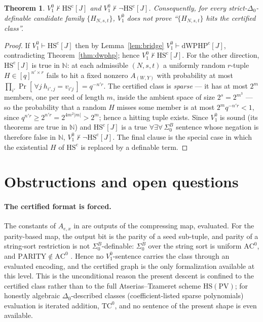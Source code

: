 \documentclass[11pt]{article}
\newtheorem{theorem}{Theorem}
\theoremstyle{definition}
\theoremstyle{remark}
\newcommand{\Vone}{V^0_1}
\newcommand{\HScert}{\mathrm{HS}^{\mathrm{c}}}
\newcommand{\dWPHPcert}{\mathrm{dWPHP}^{\mathrm{c}}}
\newcommand{\SigmaB}{\Sigma^B_0}
\begin{document}
\begin{theorem}\label{thm:hs}
$\Vone\nvdash\HScert[J]$ and $\Vone\nvdash\neg\HScert[J]$. Consequently, for
every strict-$\Delta_0$-definable candidate family $\{H_{N,s,t}\}$, $\Vone$ does
not prove ``$\{H_{N,s,t}\}$ hits the certified class''.
\end{theorem}

\begin{proof}
If $\Vone\vdash\HScert[J]$ then by Lemma~\ref{lem:bridge}
$\Vone\vdash\dWPHPcert[J]$, contradicting Theorem~\ref{thm:dwphp}; hence
$\Vone\nvdash\HScert[J]$. For the other direction, $\HScert[J]$ is true in
$\mathbb N$: at each admissible $(N,s,t)$ a uniformly random $r$-tuple $H\in
[q]^{n'\times r}$ fails to hit a fixed nonzero $A_{(W,Y)}$ with probability at
most $\prod_{i'}\Pr[\,\forall j\ h_{i',j}=v_{i'j}\,]=q^{-n'r}$. The certified
class is \emph{sparse} --- it has at most $2^{m}$ members, one per seed of length
$m$, inside the ambient space of size $2^{s}=2^{m^3}$
\cite[footnote~3]{AtseriasTzameret2025} --- so the probability that a random $H$
misses some member is at most $2^{m}q^{-n'r}<1$, since
$q^{n'r}\ge 2^{n'r}=2^{4m^2|m|}>2^{m}$; hence a hitting tuple exists. Since $\Vone$ is sound
(its theorems are true in $\mathbb N$) and $\HScert[J]$ is a true
$\forall\exists\forall\,\SigmaB$ sentence whose negation is therefore false in
$\mathbb N$, $\Vone\nvdash\neg\HScert[J]$. The final clause is the special case
in which the existential $H$ of $\HScert$ is replaced by a definable term.
\end{proof}

\section{Obstructions and open questions}\label{sec:obstructions}

\paragraph{The certified format is forced.} The constants of $A_{e,x}$ in
\cite{AtseriasTzameret2025} are outputs of the compressing map, evaluated. For
the parity-based map, the output bit is the parity of a seed sub-tuple, and
parity of a string-sort restriction is not $\SigmaB$-definable: $\SigmaB$ over
the string sort is uniform $\mathrm{AC}^0$, and $\mathrm{PARITY}\notin
\mathrm{AC}^0$ \cite{Ajtai1994}. Hence no $\Vone$-sentence carries the class
through an evaluated encoding, and the certified graph is the only
formalization available at this level. This is the unconditional reason the
present descent is confined to the certified class rather than to the full
Atserias--Tzameret scheme $\mathrm{HS}(\mathrm{PV})$; for honestly algebraic
$\Delta_0$-described classes (coefficient-listed sparse polynomials) evaluation
is iterated addition, $\mathrm{TC}^0$, and no sentence of the present shape is
even available.
\end{document}
